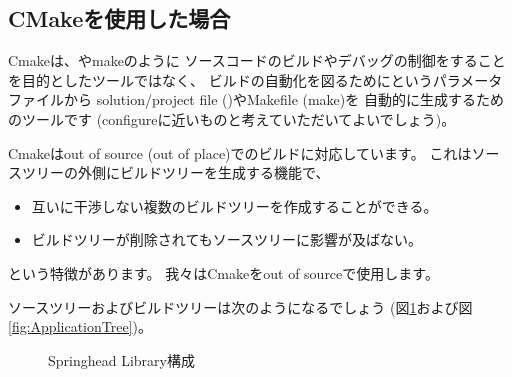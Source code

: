 \subsection{CMakeを使用した場合}
\label{subsec:WhenUsedCMake}

\noindent
Cmakeは、\VS やmakeのように
ソースコードのビルドやデバッグの制御をすることを目的としたツールではなく、
ビルドの自動化を図るために\CMakeLists というパラメータファイルから
solution/project file (\VS)やMakefile (make)を
自動的に生成するためのツールです
(configureに近いものと考えていただいてよいでしょう)。

Cmakeはout of source (out of place)でのビルドに対応しています。
これはソースツリーの外側にビルドツリーを生成する機能で、
\begin{itemize}
  \item	互いに干渉しない複数のビルドツリーを作成することができる。
  \item	ビルドツリーが削除されてもソースツリーに影響が及ばない。
\end{itemize}
という特徴があります。
我々はCmakeをout of sourceで使用します。

\medskip
ソースツリーおよびビルドツリーは次のようになるでしょう
(図\ref{fig:SpringheadLibraryTree}および図\ref{fig:ApplicationTree})。

\begin{narrow}\begin{figure}[h]
    \begin{narrow}[40pt]\begin{minipage}{\textwidth}
	{\footnotesize{}}
	\medskip
    \end{minipage}\end{narrow}
    \caption{Springhead Library構成}
    \label{fig:SpringheadLibraryTree}
\end{figure}\end{narrow}

